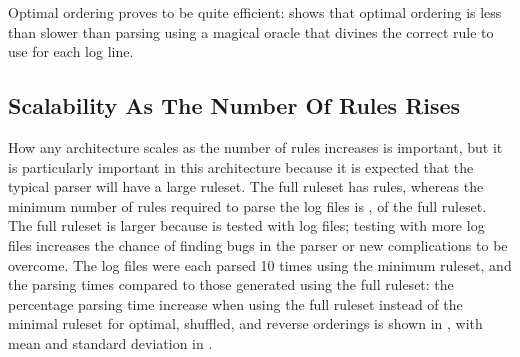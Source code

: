 Optimal ordering proves to be quite efficient:  shows that optimal ordering is less than
 slower than parsing
using a magical oracle that divines the correct rule to use for each log
line.






\FloatBarrier{}

\subsection{Scalability As The Number Of Rules Rises}

\label{scalability as the number of rules rises}

How any architecture scales as the number of rules increases is important,
but it is particularly important in this architecture because it is
expected that the typical parser will have a large ruleset.  The full
\parsername{} ruleset has \numberOFrules{} rules, whereas the minimum
number of rules required to parse the \numberOFlogFILES{} log files is
\numberOFrulesMINIMUM{}, \numberOFrulesMINIMUMpercentage{} of the full
ruleset.  The full ruleset is larger because \parsername{} is tested with
\numberOFlogFILESall{} log files; testing with more log files increases the
chance of finding bugs in the parser or new complications to be overcome.
The \numberOFlogFILES{} log files were each parsed 10 times using the
minimum ruleset, and the parsing times compared to those generated using
the full ruleset: the percentage parsing time increase when using the full
ruleset instead of the minimal ruleset for optimal, shuffled, and reverse
orderings is shown in , with mean and standard
deviation in .

